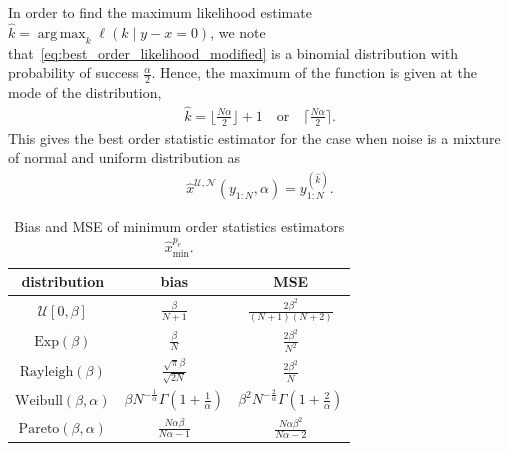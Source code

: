 \documentclass{article}
\DeclareMathOperator*{\argmax}{arg\,max}
\begin{document}
In order to find the maximum likelihood estimate $\hat{k} = \argmax_k \ell(k\mid y-x=0)$, we note that~\eqref{eq:best_order_likelihood_modified} is a binomial distribution with probability of success $\frac{\alpha}{2}$. Hence, the maximum of the function is given at the mode of the distribution, 
%
%
\begin{align}
\hat{k}=\lfloor \frac{N\alpha}{2}\rfloor+1\quad \mathrm{or}\quad \lceil\frac{N\alpha}{2}\rceil.
\end{align}
%
%
This gives the best order statistic estimator for the case when noise is a mixture of normal and uniform distribution as
%
%
\begin{align}
\hat{x}^{\mathrm{\mathrm{\mathcal{U},\mathcal{N}}}}(y_{1:N},\alpha)= y^{(\hat{k})}_{1:N}.
\end{align}
%
%
\begin{table}[ht]
	\centering
	\caption{Bias and MSE of minimum order statistics estimators $\hat{x}_{\mathrm{min}}^{p_e}$.}
	\begin{tabular}{c|c|c}
		\hline
		distribution                     & bias                                                   & MSE                                                      \\ \hline
		$\mathcal{U}[0,\beta]$               & $\frac{\beta}{N+1}$                                        & $\frac{2\beta^2}{(N+1)(N+2)}$                            \\[2mm] \hline
		$\mathrm{Exp}(\beta)$            & $\frac{\beta}{N}$                                      & $\frac{2\beta^2}{N^2}$                                   \\[2mm] \hline
		$\mathrm{Rayleigh}(\beta)$       & $\frac{\sqrt{\pi}\beta}{\sqrt{2N}}$                    & $\frac{2\beta^2}{N}$                                     \\[2mm] \hline
		$\mathrm{Weibull}(\beta,\alpha)$ & $\beta N^{-\frac{1}{\alpha}}\Gamma(1+\frac{1}{\alpha})$ & $\beta^2N^{-\frac{2}{\alpha}}\Gamma(1+\frac{2}{\alpha})$ \\[2mm] \hline
		$\mathrm{Pareto}(\beta,\alpha)$  & $\frac{N\alpha\beta}{N\alpha -1}$                      & $\frac{N\alpha\beta^2}{N\alpha -2}$                      \\ \hline
	\end{tabular}
	\label{tbl:estimators_biased}
\end{table}
\end{document}
